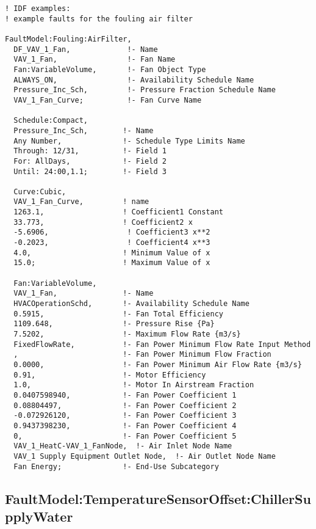\begin{lstlisting}
! IDF examples:
! example faults for the fouling air filter 

FaultModel:Fouling:AirFilter,
  DF_VAV_1_Fan,             !- Name
  VAV_1_Fan,                !- Fan Name
  Fan:VariableVolume,       !- Fan Object Type
  ALWAYS_ON,                !- Availability Schedule Name
  Pressure_Inc_Sch,         !- Pressure Fraction Schedule Name
  VAV_1_Fan_Curve;          !- Fan Curve Name

  Schedule:Compact,
  Pressure_Inc_Sch,        !- Name
  Any Number,              !- Schedule Type Limits Name
  Through: 12/31,          !- Field 1
  For: AllDays,            !- Field 2
  Until: 24:00,1.1;        !- Field 3

  Curve:Cubic,        
  VAV_1_Fan_Curve,         ! name     
  1263.1,                  ! Coefficient1 Constant        
  33.773,                  ! Coefficient2 x       
  -5.6906,                  ! Coefficient3 x**2        
  -0.2023,                  ! Coefficient4 x**3        
  4.0,                     ! Minimum Value of x       
  15.0;                    ! Maximum Value of x       

  Fan:VariableVolume,
  VAV_1_Fan,               !- Name
  HVACOperationSchd,       !- Availability Schedule Name
  0.5915,                  !- Fan Total Efficiency
  1109.648,                !- Pressure Rise {Pa}
  7.5202,                  !- Maximum Flow Rate {m3/s}
  FixedFlowRate,           !- Fan Power Minimum Flow Rate Input Method
  ,                        !- Fan Power Minimum Flow Fraction
  0.0000,                  !- Fan Power Minimum Air Flow Rate {m3/s}
  0.91,                    !- Motor Efficiency
  1.0,                     !- Motor In Airstream Fraction
  0.0407598940,            !- Fan Power Coefficient 1
  0.08804497,              !- Fan Power Coefficient 2
  -0.072926120,            !- Fan Power Coefficient 3
  0.9437398230,            !- Fan Power Coefficient 4
  0,                       !- Fan Power Coefficient 5
  VAV_1_HeatC-VAV_1_FanNode,  !- Air Inlet Node Name
  VAV_1 Supply Equipment Outlet Node,  !- Air Outlet Node Name
  Fan Energy;              !- End-Use Subcategory
\end{lstlisting}

\subsection{FaultModel:TemperatureSensorOffset:ChillerSupplyWater}\label{faultmodeltemperaturesensoroffsetchillersupplywater}

